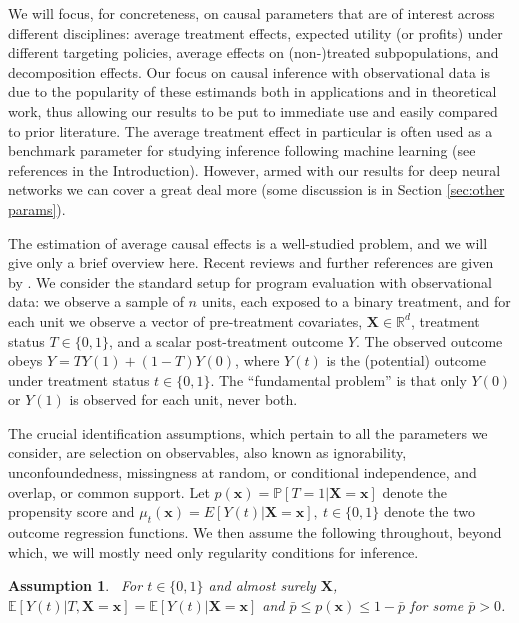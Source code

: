 \documentclass[11pt]{article}
\newtheorem{assumption}{Assumption}
\numberwithin{equation}{section}
\theoremstyle{definition}
\newcommand{\E}{\mathbb{E}}
\renewcommand{\P}{\mathbb{P}}
\newcommand{\R}{\mathbb{R}}
\newcommand{\bx}{\bm{x}}
\newcommand{\bX}{\bm{X}}
\begin{document}
We will focus, for concreteness, on causal parameters that are of interest across different disciplines: average treatment effects, expected utility (or profits) under different targeting policies, average effects on (non-)treated subpopulations, and decomposition effects. Our focus on causal inference with observational data is due to the popularity of these estimands both in applications and in theoretical work, thus allowing our results to be put to immediate use and easily compared to prior literature. The average treatment effect in particular is often used as a benchmark parameter for studying inference following machine learning (see references in the Introduction). However, armed with our results for deep neural networks we can cover a great deal more (some discussion is in Section \ref{sec:other params}).


The estimation of average causal effects is a well-studied problem, and we will give only a brief overview here. Recent reviews and further references are given by \citet{Belloni-etal2017_Ecma,Athey-Imbens-Pham-Wager2017_AERPP,Abadie-Cattaneo2018_ARE}. We consider the standard setup for program evaluation with observational data: we observe a sample of $n$ units, each exposed to a binary treatment, and for each unit we observe a vector of pre-treatment covariates, $\bX \in \R^d$, treatment status $T \in \{0,1\}$, and a scalar post-treatment outcome $Y$. The observed outcome obeys $Y = T Y(1) + (1-T)Y(0)$, where $Y(t)$ is the (potential) outcome under treatment status $t \in \{0,1\}$. The ``fundamental problem'' is that only $Y(0)$ or $Y(1)$ is observed for each unit, never both. 



The crucial identification assumptions, which pertain to all the parameters we consider, are selection on observables, also known as ignorability, unconfoundedness, missingness at random, or conditional independence, and overlap, or common support. Let $p(\bx) = \P[T = 1 \vert \bX = \bx]$ denote the propensity score and $\mu_t(\bx) = E[Y(t) \vert \bX=\bx], \ t \in \{0,1\}$ denote the two outcome regression functions. We then assume the following throughout, beyond which, we will mostly need only regularity conditions for inference.
\begin{assumption}
	\label{asmpt:ignorability} \
	For $t \in \{0,1\}$ and almost surely $\bX$, $\E[Y(t) \vert T, \bX=\bx] = \E[Y(t) \vert \bX=\bx]$ and $\bar{p} \leq p(\bx) \leq 1 - \bar{p}$ for some $\bar{p} > 0$.
\end{assumption}
\end{document}
